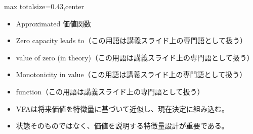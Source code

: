 \clearpage
{}
\begin{minipage}[t]{0.405\textwidth}
\begin{adjustbox}{max totalsize={\textwidth}{0.43\textheight},center}
\begin{minipage}{\textwidth}\scriptsize
{}\begin{itemize}
\item Approximated 価値関数
\item Zero capacity leads to（この用語は講義スライド上の専門語として扱う）
\item value of zero (in theory)（この用語は講義スライド上の専門語として扱う）
\item Monotonicity in value（この用語は講義スライド上の専門語として扱う）
\item function（この用語は講義スライド上の専門語として扱う）
\end{itemize}\begin{itemize}
\item VFAは将来価値を特徴量に基づいて近似し、現在決定に組み込む。
\item 状態そのものではなく、価値を説明する特徴量設計が重要である。
\end{itemize}
\end{minipage}
\end{adjustbox}
\end{minipage}\hfill
